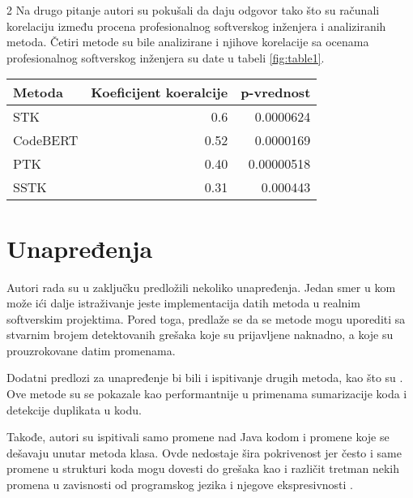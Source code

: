 \documentclass[twocolumns]{article}
\begin{document}
\begin{multicols}{2}
  Na drugo pitanje autori su pokušali da daju odgovor tako što su računali korelaciju između procena profesionalnog softverskog inženjera i analiziranih metoda. Četiri metode su bile analizirane i njihove korelacije sa ocenama profesionalnog softverskog inženjera su date u tabeli \ref{fig:table1}.
  
  \begin{table*}
    \begin{center}
      
      \begin{tabular}{l|r|r}
        Metoda & Koeficijent koeralcije & p-vrednost \\
        \hline
        STK        & 0.6 &0.0000624 \\
        CodeBERT   & 0.52&0.0000169 \\
        PTK        & 0.40    & 0.00000518         \\
        SSTK   &   0.31  & 0.000443         \\
        \hline
      \end{tabular}
    \end{center}
    \caption{Koeficijenti korelacije}
    \label{fig:table1}
  \end{table*}
  
  
  
  \section{Unapređenja}
  \label{sec:improvements}
  
  Autori rada su u zaključku predložili nekoliko unapređenja. Jedan smer u kom može ići dalje istraživanje jeste implementacija datih metoda u realnim softverskim projektima. Pored toga, predlaže se da se metode mogu uporediti sa stvarnim brojem detektovanih grešaka koje su prijavljene naknadno, a koje su prouzrokovane datim promenama. 
  
  Dodatni predlozi za unapređenje bi bili i ispitivanje drugih metoda, kao što su \cite{guo2020graphcodebert,ligraphplbart,hoang2020cc2vec}. Ove metode su se pokazale kao performantnije u primenama sumarizacije koda i detekcije duplikata u kodu. 
  
  Takođe, autori su ispitivali samo promene nad Java kodom i promene koje se dešavaju unutar metoda klasa. Ovde nedostaje šira pokrivenost jer često i same promene u strukturi koda mogu dovesti do grešaka kao i različit tretman nekih promena u zavisnosti od programskog jezika i njegove ekspresivnosti \cite{torley2008expressiveness}. 
  

\end{multicols}
\end{document}
